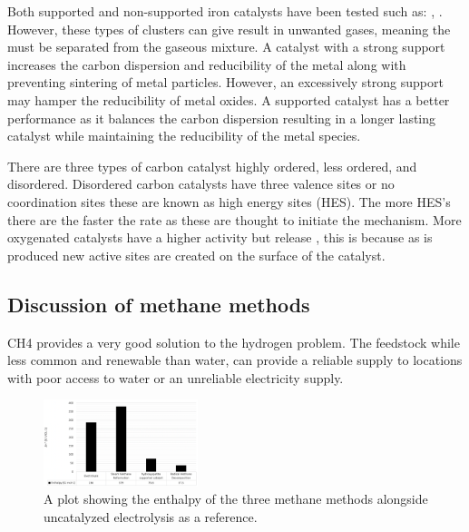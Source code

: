 \begin{multicols}{2}

Both supported and non-supported iron catalysts have been tested such as: \ce{[Fe(CO)5]},  \ce{[Fe(cp)2]}.
However, these types of clusters can give result in unwanted gases, meaning the  must be separated from the gaseous mixture.
A catalyst with a strong support increases the carbon dispersion and reducibility of the metal along with preventing sintering of metal particles.
However, an excessively strong support may hamper the reducibility of metal oxides.
A supported catalyst has a better performance as it balances the carbon dispersion resulting in a longer lasting catalyst while maintaining the reducibility of the metal species.

There are three types of carbon catalyst highly ordered, less ordered, and disordered.
Disordered carbon catalysts have three valence sites or no coordination sites these are known as high energy sites (HES).
The more HES’s there are the faster the rate as these are thought to initiate the mechanism.
More oxygenated catalysts have a higher activity but release , this is because as  is produced new active sites are created on the surface of the catalyst.

\subsection{Discussion of methane methods}%
\label{sub:discussion_of_methane_methods}

CH4 provides a very good solution to the hydrogen problem.
The feedstock while less common and renewable than water, can provide a reliable  supply to locations with poor access to water or an unreliable electricity supply.

\begin{figure}[H]
	\centering
	\includegraphics[width=0.4\textwidth]{6b76c760-2cb9-11eb-895f-8c8590753a48.png}
	\caption{A plot showing the enthalpy of the three methane methods alongside uncatalyzed electrolysis as a reference.\cite{SBN2020,Ashok,Saxena2011}}
	\label{fig:ME_disc}
\end{figure}


\end{multicols}
